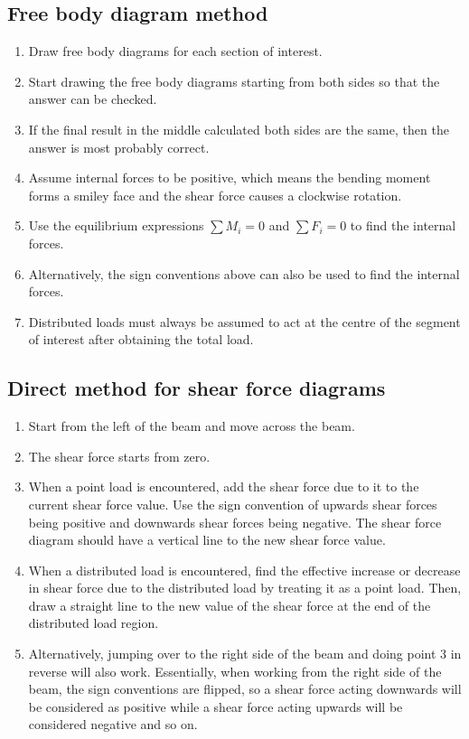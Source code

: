 \documentclass[11pt]{article}
\begin{document}
\subsection{Free body diagram method}
\label{sec:org2b2d1fc}
\begin{enumerate}
\item Draw free body diagrams for each section of interest.
\item Start drawing the free body diagrams starting from both sides so that the answer can be checked.
\item If the final result in the middle calculated both sides are the same, then the answer is most probably correct.
\item Assume internal forces to be positive, which means the bending moment forms a smiley face and the shear force causes a clockwise rotation.
\item Use the equilibrium expressions \(\sum M_i = 0\) and \(\sum F_i = 0\) to find the internal forces.
\item Alternatively, the sign conventions above can also be used to find the internal forces.
\item Distributed loads must always be assumed to act at the centre of the segment of interest after obtaining the total load.
\end{enumerate}

\newpage

\subsection{Direct method for shear force diagrams}
\label{sec:org3a047e0}
\begin{enumerate}
\item Start from the left of the beam and move across the beam.
\item The shear force starts from zero.
\item When a point load is encountered, add the shear force due to it to the current shear force value. Use the sign convention of upwards shear forces being positive and downwards shear forces being negative. The shear force diagram should have a vertical line to the new shear force value.
\item When a distributed load is encountered, find the effective increase or decrease in shear force due to the distributed load by treating it as a point load. Then, draw a straight line to the new value of the shear force at the end of the distributed load region.
\item Alternatively, jumping over to the right side of the beam and doing point 3 in reverse will also work. Essentially, when working from the right side of the beam, the sign conventions are flipped, so a shear force acting downwards will be considered as positive while a shear force acting upwards will be considered negative and so on.
\end{enumerate}
\end{document}

